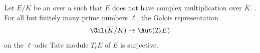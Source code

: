 \begin{theorem} \label{theorem:serres_original_open_image_theorem_for_elliptic_curves_over_number_fields_without_geometric_complex_multiplication}
    Let $E/K$ be an  over a  such that $E$ does not have complex multiplication over $\overline{K}$. . For all but finitely many prime numbers $\ell$, the Galois representation
    $$\Gal(\overline{K} / K) \to \Aut(T_\ell E)$$
    on the $\ell$-adic Tate module $T_\ell E$ of $E$ is surjective.
\end{theorem}